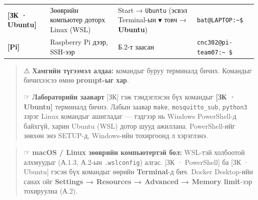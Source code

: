 \begin{longtable}[]{@{}llll@{}}
\begin{minipage}[t]{0.22\columnwidth}
\textbf{{[}ЗК · Ubuntu{]}}\strut
\end{minipage} & \begin{minipage}[t]{0.22\columnwidth}\raggedright
Зөөврийн компьютер доторх Linux (WSL)\strut
\end{minipage} & \begin{minipage}[t]{0.22\columnwidth}\raggedright
Start → \texttt{Ubuntu} (эсвэл Terminal-ын \texttt{▼} товч → \textbf{Ubuntu})\strut
\end{minipage} & \begin{minipage}[t]{0.22\columnwidth}\raggedright
\texttt{bat@LAPTOP:\textasciitilde{}\$}\strut
\end{minipage}\tabularnewline
\begin{minipage}[t]{0.22\columnwidth}\raggedright
\textbf{{[}Pi{]}}\strut
\end{minipage} & \begin{minipage}[t]{0.22\columnwidth}\raggedright
Raspberry Pi дээр, SSH-ээр\strut
\end{minipage} & \begin{minipage}[t]{0.22\columnwidth}\raggedright
Б.2-т заасан\strut
\end{minipage} & \begin{minipage}[t]{0.22\columnwidth}\raggedright
\texttt{cnc302@pi-team07:\textasciitilde{}\ \$}\strut
\end{minipage}\tabularnewline
\bottomrule
\end{longtable}\endgroup

\begin{quote}
⚠ \textbf{Хамгийн түгээмэл алдаа:} командыг буруу терминалд бичих. Командыг бичихээсээ өмнө \textbf{prompt-ыг хар}.

☞ \textbf{Лабораторийн зааварт} {[}ЗК{]} гэж тэмдэглэсэн бүх командыг \textbf{{[}ЗК · Ubuntu{]}} терминалд бичнэ. Лабын заавар \texttt{make}, \texttt{mosquitto\_sub}, \texttt{python3} зэрэг Linux командыг ашигладаг --- тэдгээр нь Windows PowerShell-д байхгүй, харин Ubuntu (WSL) дотор шууд ажиллана. PowerShell-ийг зөвхөн энэ SETUP-д, Windows-ийн тохиргоонд л хэрэглэнэ.
\end{quote}

\begin{quote}
☞ \textbf{macOS / Linux зөөврийн компьютертэй бол:} WSL-тэй холбоотой алхмуудыг (А.1.3, А.2-ын \texttt{.wslconfig}) алгас. {[}ЗК · PowerShell{]} ба {[}ЗК · Ubuntu{]} гэсэн бүх командыг өөрийн \textbf{Terminal}-д бич. Docker Desktop-ийн санах ойг \textbf{Settings → Resources → Advanced → Memory limit}-ээр тохируулна (А.2).
\end{quote}

